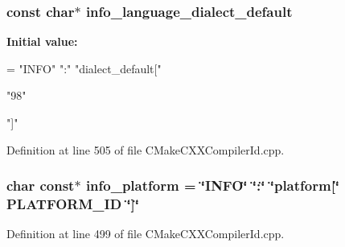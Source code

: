 \subsubsection[{info\+\_\+language\+\_\+dialect\+\_\+default}]{\setlength{\rightskip}{0pt plus 5cm}const char$\ast$ info\+\_\+language\+\_\+dialect\+\_\+default}\label{_c_make_c_x_x_compiler_id_8cpp_a1ce162bad2fe6966ac8b33cc19e120b8}
{\bfseries Initial value\+:}
\begin{DoxyCode}
= \textcolor{stringliteral}{"INFO"} \textcolor{stringliteral}{":"} \textcolor{stringliteral}{"dialect\_default["}







  \textcolor{stringliteral}{"98"}

\textcolor{stringliteral}{"]"}
\end{DoxyCode}


Definition at line 505 of file C\+Make\+C\+X\+X\+Compiler\+Id.\+cpp.

\subsubsection[{info\+\_\+platform}]{\setlength{\rightskip}{0pt plus 5cm}char const$\ast$ info\+\_\+platform = \char`\"{}I\+N\+FO\char`\"{} \char`\"{}\+:\char`\"{} \char`\"{}platform[\char`\"{} P\+L\+A\+T\+F\+O\+R\+M\+\_\+\+ID \char`\"{}]\char`\"{}}\label{_c_make_c_x_x_compiler_id_8cpp_a2321403dee54ee23f0c2fa849c60f7d4}


Definition at line 499 of file C\+Make\+C\+X\+X\+Compiler\+Id.\+cpp.

